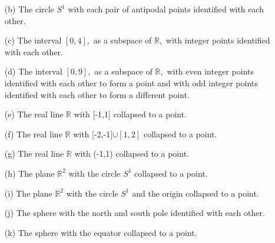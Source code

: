 \documentclass[12pt]{article}
\newcommand{\1}{^{-1}}
\begin{document}
\begin{enumerate}
\begin{enumerate}
		\item[(b)] The circle $S^{1}$ with each pair of antipodal points identified with each other.\\
		
		\item[(c)] The interval $[0,4],$ as a subspace of $\mathbb{R},$ with integer points identified with each other.\\
		
		\item[(d)] The interval $[0,9],$ as a subspace of $\mathbb{R},$ with even integer points identified with each other to form a point and with odd integer points identified with each other to form a different point.\\
		
		\item[(e)] The real line $\mathbb{R}$ with [-1,1] collapsed to a point.\\
		
		\item[(f)] The real line $\mathbb{R}$ with [-2,-1]$\cup[1,2]$ collapsed to a point.\\
		
		\item[(g)] The real line $\mathbb{R}$ with (-1,1) collapsed to a point.\\
		
		\item[(h)] The plane $\mathbb{R}^{2}$ with the circle $S^{1}$ collapsed to a point.\\
		
		\item[(i)] The plane $\mathbb{R}^{2}$ with the circle $S^{1}$ and the origin collapsed to a point.\\
		
		\item[(j)] The sphere with the north and south pole identified with each other.\\
		
		\item[(k)] The sphere with the equator collapsed to a point.\\
	
	\end{enumerate}


\end{enumerate}
\end{document}
